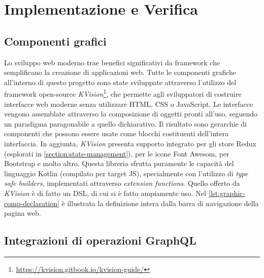 \chapter{Implementazione e Verifica}

\section{Componenti grafici}
Lo sviluppo web moderno trae benefici significativi da framework che semplificano la creazione di applicazioni web. Tutte le componenti grafiche all'interno di questo progetto sono state sviluppate attraverso l'utilizzo del framework open-source \textit{KVision}\footnote{\url{https://kvision.gitbook.io/kvision-guide/}}, che permette agli sviluppatori di costruire interfacce web moderne senza utilizzare HTML, CSS o JavaScript. Le interfacce vengono assemblate attraverso la composizione di oggetti pronti all'uso, seguendo un paradigma paragonabile a quello dichiarativo. Il risultato sono gerarchie di componenti che possono essere usate come blocchi costituenti dell'intera interfaccia. In aggiunta, \textit{KVision} presenta supporto integrato per gli store Redux (esplorati in \cref{section:state-management}), per le icone Font Awesom, per Bootstrap e molto altro. Questa libreria sfrutta puramente le capacità del linguaggio Kotlin (compilato per target JS), specialmente con l'utilizzo di \textit{type safe builders}, implementati attraverso \textit{extension functions}. Quello offerto da \textit{KVision} è di fatto un \ac{DSL}, di cui si è fatto ampiamente uso.
Nel \cref{lst:graphic-comp-declaration} è illustrata la definizione intera dalla barra di navigazione della pagina web.



\section{Integrazioni di operazioni GraphQL}

